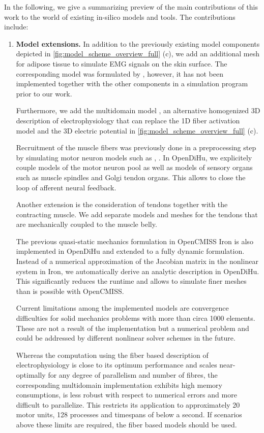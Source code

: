 In the following, we give a summarizing preview of the main contributions of this work to the world of existing in-silico models and tools. The contributions include:
\begin{enumerate}[label=(\roman*)]
  \item \textbf{Model extensions.} In addition to the previously existing model components depicted in \cref{fig:model_scheme_overview_full} (c), we add an additional mesh for adipose tissue to simulate EMG signals on the skin surface. The corresponding model was formulated by \cite{Mordhorst2015}, however, it has not been implemented together with the other components in a simulation program prior to our work.

Furthermore, we add the multidomain model \cite{Klotz2020}, an alternative homogenized 3D description of electrophysiology that can replace the 1D fiber activation model and the 3D electric potential in \cref{fig:model_scheme_overview_full} (c). 

Recruitment of the muscle fibers was previously done in a preprocessing step by simulating motor neuron models such as \cite{Cisi2008}, \cite{Negro2011}. In OpenDiHu, we explicitely couple models of the motor neuron pool as well as models of sensory organs such as muscle spindles and Golgi tendon organs. This allows to close the loop of afferent neural feedback.

Another extension is the consideration of tendons together with the contracting muscle. We add separate models and meshes for the tendons that are mechanically coupled to the muscle belly.

The previous quasi-static mechanics formulation in OpenCMISS Iron is also implemented in OpenDiHu and extended to a fully dynamic formulation. Instead of a numerical approximation of the Jacobian matrix in the nonlinear system in Iron, we automatically derive an analytic description in OpenDiHu. This significantly reduces the runtime and allows to simulate finer meshes than is possible with OpenCMISS.

Current limitations among the implemented models are convergence difficulties for solid mechanics problems with more than circa 1000 elements. These are not a result of the implementation but a numerical problem and could be addressed by different nonlinear solver schemes in the future.

Whereas the computation using the fiber based description of electrophysiology is close to its optimum performance and scales near-optimally for any degree of parallelism and number of fibres, the corresponding multidomain implementation exhibits high memory consumptions, is less robust with respect to numerical errors and more difficult to parallelize. This restricts its application to approximately 20 motor units, 128 processes and timespans of below a second. If scenarios above these limits are required, the fiber based models should be used.


\end{enumerate}
